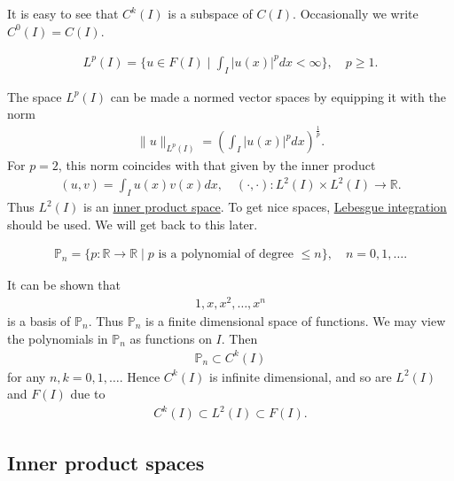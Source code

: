 \documentclass[12pt,oneside]{amsart}
\def\R{\mathbb R}
\begin{document}
It is easy to see that $C^k(I)$ is a subspace of $C(I)$. Occasionally we write $C^0(I) = C(I)$.

\begin{definition}
    \begin{align*}
L^p(I) = \{u \in F(I) \mid \int_I |u(x)|^p dx < \infty \}, 
\quad p \ge 1.
    \end{align*}
\end{definition}

The space $L^p(I)$ can be made a normed vector spaces by equipping it with the norm 
    \begin{align*}
\|u\|_{L^p(I)} = \left( \int_I |u(x)|^p dx \right)^{\frac1p}.
    \end{align*}
For $p=2$, this norm coincides with that given by the inner product
    \begin{align*}
(u, v) = \int_I u(x) v(x) dx, \quad (\cdot, \cdot) : L^2(I) \times L^2(I) \to \mathbb R.
    \end{align*}
Thus $L^2(I)$ is an \href{https://en.wikipedia.org/wiki/Inner_product_space}{inner product space}.
To get nice spaces, \href{https://en.wikipedia.org/wiki/Lebesgue_integration}{Lebesgue integration} should be used. We will get back to this later.

\begin{definition}
    \begin{align*}
\mathbb P_n = \{p : \R \to \R \mid \text{$p$ is a polynomial of degree $\le n$}\}, \quad n = 0, 1, \dots.
    \end{align*}
\end{definition}

It can be shown that 
    \begin{align*}
1, x, x^2, \dots, x^n
    \end{align*}
is a basis of $\mathbb P_n$. Thus $\mathbb P_n$ is a finite dimensional space of functions. 
We may view the polynomials in $\mathbb P_n$ as functions on $I$. Then
    \begin{align*}
\mathbb P_n \subset C^k(I)
    \end{align*}
for any $n,k=0,1,\dots$. Hence $C^k(I)$ is infinite dimensional,
and so are $L^2(I)$ and $F(I)$ due to 
    \begin{align*}
C^k(I) \subset L^2(I) \subset F(I).
    \end{align*}

\subsection{Inner product spaces}
\end{document}

